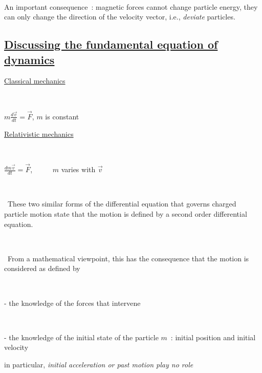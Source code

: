 \documentclass[12pt]{paper}
\newcommand{\F}{\ensuremath{\vec F}}
\newcommand{\nin}{\noindent}
\newcommand{\vv}{\ensuremath{\vec v}}
\newcommand{\blue}{\color{blue}}
\begin{document}
~

{\blue An important consequence~:  magnetic forces cannot change particle energy, they can only 
change the direction of the velocity vector, i.e., \textsl{deviate} particles. }





\clearpage

\subsection*{\Large \underline{Discussing the fundamental equation of dynamics}}


\begin{minipage}[b]{.49\linewidth}
\centering
\Large

\blue 

\underline{Classical mechanics}

~

$m \frac{ \textstyle{d\vv}}{\textstyle{dt}} = \F $, $m$ is constant

\end{minipage}
\hspace{.01\linewidth}
\begin{minipage}[b]{.49\linewidth}
\centering
\Large

\blue 

\underline{Relativistic mechanics}


~

$\frac{ \textstyle{dm\vv}}{\textstyle{dt}} = \F $, ~ ~   ~ $m$ varies with $\vv$


\end{minipage}

~

\nin\ These two similar forms of the differential equation that governs charged particle motion state that the motion is 
defined by a second order differential equation. 

~


\nin\  From a mathematical viewpoint, this has the consequence that the motion is considered as defined by 


~

- the knowledge of the forces that intervene

~

-  the knowledge of the initial state of the particle $m$~: initial position and initial velocity~

in particular,   \textsl{initial acceleration or past motion play no role} 
\end{document}
